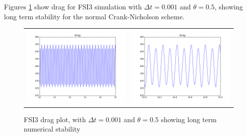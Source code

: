 Figures \ref{fig: FSI3_long_short} show drag for FSI3 simulation with $\Delta t = 0.001$ and $\theta = 0.5$, showing long term stability for the normal Crank-Nicholson scheme.

\begin{figure}[H]
\begin{tabular}{ll}
\includegraphics[scale=0.4]{./Temporal_stability/FSI3_0001_050_big.png}
&
\includegraphics[scale=0.4]{./Temporal_stability/FSI3_0001_050_small.png}
\end{tabular}
\caption{FSI3 drag plot, with $\Delta t = 0.001$ and $\theta =0.5$ showing long term numerical stability}
\label{fig: FSI3_long_short}
\end{figure}

